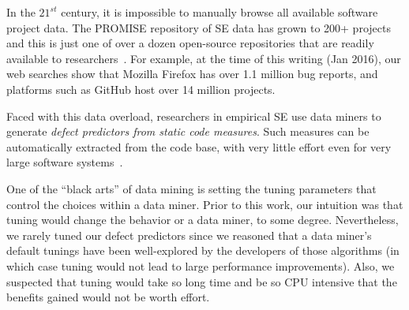 \documentclass[smallextended]{svjour3}
\begin{document}
In the $21^{st}$ century, it is  impossible
to manually browse all  available software project
data. The PROMISE repository of SE data has grown to 200+ projects~\cite{promise15}
and this is just one of over a dozen open-source repositories
that are readily available to researchers~\cite{rod12}.
For example, at the time of this writing (Jan 2016), our web searches show that Mozilla Firefox has over 1.1 million bug reports, and platforms such as GitHub host over 14 million projects. 

Faced with this data overload,
researchers in empirical SE
use  data miners  to generate 
{\em defect predictors from static code measures}.
Such   measures can be
automatically extracted from the code base, with very little effort
even for very large software systems~\cite{nagappan05}. 

One of the ``black arts'' of data mining is setting the tuning
parameters that control  the choices within a data miner.
Prior to this work, our intuition was that tuning would change the behavior or a data miner, to some degree. Nevertheless, we rarely tuned our  defect predictors 
since we reasoned
that a data miner's default tunings have been well-explored by the developers of those algorithms (in which case
tuning would not lead to large performance improvements).
Also, we suspected that
tuning would take so long time and be so CPU intensive that the benefits gained   would not be worth effort.
\end{document}
